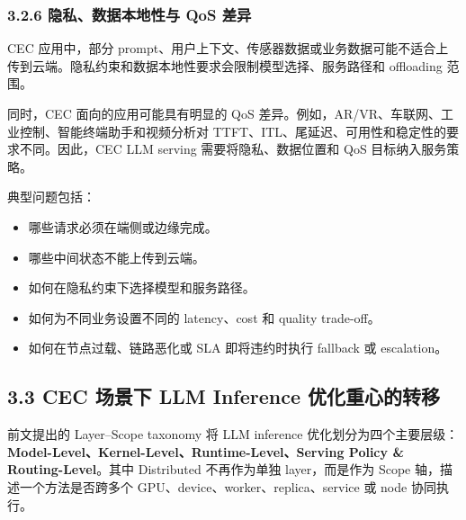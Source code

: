 \documentclass[a4paper,10pt]{ctexart}
\begin{document}
\subsubsection*{3.2.6 隐私、数据本地性与 QoS 差异}



CEC 应用中，部分 prompt、用户上下文、传感器数据或业务数据可能不适合上传到云端。隐私约束和数据本地性要求会限制模型选择、服务路径和 offloading 范围。




同时，CEC 面向的应用可能具有明显的 QoS 差异。例如，AR/VR、车联网、工业控制、智能终端助手和视频分析对 TTFT、ITL、尾延迟、可用性和稳定性的要求不同。因此，CEC LLM serving 需要将隐私、数据位置和 QoS 目标纳入服务策略。




典型问题包括：




\begin{itemize}
\item 哪些请求必须在端侧或边缘完成。

\item 哪些中间状态不能上传到云端。

\item 如何在隐私约束下选择模型和服务路径。

\item 如何为不同业务设置不同的 latency、cost 和 quality trade-off。

\item 如何在节点过载、链路恶化或 SLA 即将违约时执行 fallback 或 escalation。



\end{itemize}




\subsection*{3.3 CEC 场景下 LLM Inference 优化重心的转移}



前文提出的 Layer–Scope taxonomy 将 LLM inference 优化划分为四个主要层级：\textbf{Model-Level、Kernel-Level、Runtime-Level、Serving Policy \& Routing-Level}。其中 Distributed 不再作为单独 layer，而是作为 Scope 轴，描述一个方法是否跨多个 GPU、device、worker、replica、service 或 node 协同执行。
\end{document}
